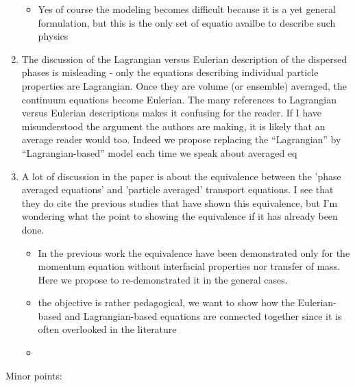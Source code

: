 \documentclass[10pt,a4paper]{article}
\newcommand{\tb}[1]{\color{blue}#1\color{black}}
\begin{document}
\begin{enumerate}
{\begin{itemize}
        Citer lhuillier 2009 ou il dit que c'est indispensable.   
        \item Yes of course the modeling becomes difficult because it is a yet general formulation, but this is the only set of equatio availbe to describe such physics 
    \end{itemize}}
    \item The discussion of the Lagrangian versus Eulerian description of the dispersed phases is
    misleading - only the equations describing individual particle properties are Lagrangian.
    Once they are volume (or ensemble) averaged, the continuum equations become Eulerian.
    The many references to Lagrangian versus Eulerian descriptions makes it confusing for the
    reader. If I have misunderstood the argument the authors are making, it is likely that an
    average reader would too.
    \tb{Indeed we propose replacing the ``Lagrangian'' by ``Lagrangian-based'' model each time we speak about averaged eq}
    \item A lot of discussion in the paper is about the equivalence between the 'phase averaged
    equations' and 'particle averaged' transport equations. I see that they do cite the previous
    studies that have shown this equivalence, but I'm wondering what the point to showing the
    equivalence if it has already been done.
    \tb{
    \begin{itemize}
        \item In the previous work the equivalence have been demonstrated only for the momentum equation without interfacial properties nor transfer of mass. 
        Here we propose to re-demonstrated it in the general cases. 
        \item the objective is rather pedagogical, we want to show how the Eulerian-based and Lagrangian-based equations are connected together since it is often overlooked in the literature
        \item 
    \end{itemize}
    }
\end{enumerate}
Minor points: 
\end{document}
